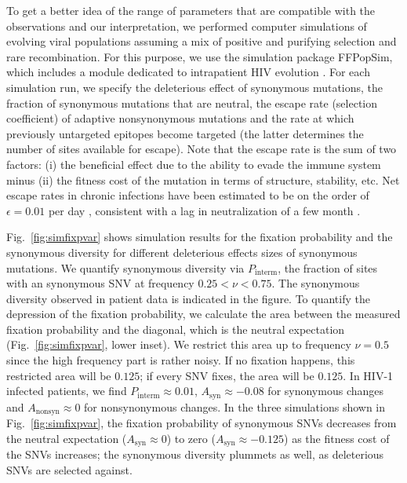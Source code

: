 \documentclass[11pt]{article}
\newcommand{\FIG}[1]{Fig.~\ref{fig:#1}}
\begin{document}
To get a better idea of the range of parameters that are compatible with the
observations and our interpretation, we performed computer simulations of
evolving viral populations assuming a mix of positive and purifying selection
and rare recombination.  For this purpose, we use the simulation package
FFPopSim, which includes a module dedicated to intrapatient HIV evolution
\citep{zanini_ffpopsim:_2012}. For each simulation run, we specify the
deleterious effect of synonymous mutations, the fraction of synonymous mutations
that are neutral, the escape rate (selection coefficient) of adaptive
nonsynonymous mutations and the rate at which previously untargeted epitopes
become targeted (the latter determines the number of sites available for
escape). Note that the escape rate is the sum of two factors: (i) the beneficial
effect due to the ability to evade the immune system minus (ii) the fitness cost
of the mutation in terms of structure, stability, etc. Net escape rates in
chronic infections have been estimated to be on the order of $\epsilon = 0.01$
per day \citep{neher_recombination_2010, Asquith:2006p28003}, consistent
with a lag in neutralization of a few month \citep{richman_rapid_2003}.

\FIG{simfixpvar} shows simulation results for the fixation probability and the
synonymous diversity for different deleterious effects sizes of synonymous mutations.
We quantify synonymous diversity via $P_\text{interm}$, the fraction of sites
with an synonymous SNV at frequency $0.25 < \nu < 0.75$. The synonymous diversity
observed in patient data is indicated in the figure. To quantify the depression
of the fixation probability, we calculate the area between the measured fixation
probability and the diagonal, which is the neutral expectation
(\FIG{simfixpvar}, lower inset). We restrict this area up to frequency
$\nu=0.5$ since the high frequency part is rather noisy.
If no fixation happens, this restricted area will be
$0.125$; if every SNV fixes, the area will be $0.125$. In HIV-1 infected
patients, we find $P_\text{interm} \approx 0.01$, $A_\text{syn} \approx -0.08$
for synonymous changes and $A_\text{nonsyn} \approx 0$ for nonsynonymous
changes. In the three simulations shown in \FIG{simfixpvar}, the fixation
probability of synonymous SNVs decreases from the neutral expectation
($A_\text{syn} \approx 0$) to zero ($A_\text{syn} \approx -0.125$) as the
fitness cost of the SNVs increases; the synonymous diversity plummets as well, as
deleterious SNVs are selected against.
\end{document}
